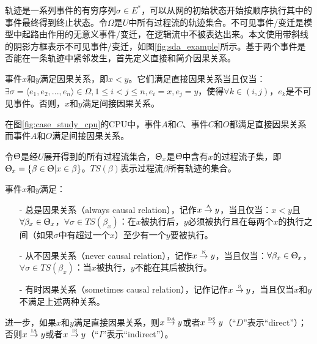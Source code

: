 轨迹是一系列事件的有穷序列$\sigma\in E^{*}$，可以从网的初始状态开始按顺序执行其中的事件最终得到终止状态。令$\Omega$是$U$中所有过程流的轨迹集合。不可见事件/变迁是模型中起路由作用的无意义事件/变迁，在逻辑流中不被表达出来\cite{wen2007mining}。本文使用带斜线的阴影方框表示不可见事件/变迁，如图\ref{fig:sda_example}所示。基于两个事件是否能在一条轨迹中紧邻发生，首先定义直接和简介因果关系。

\begin{definition}[直接和间接因果关系]\label{def:d_i_causal_relation}
事件$x$和$y$满足因果关系，即$x<y$。它们满足直接因果关系当且仅当：$\exists\sigma=\langle e_{1},e_{2},...,e_{n}\rangle\in\Omega,1\leq i<j\leq n,e_{i}=x,e_{j}=y$，使得$\forall k\in(i,j)$，$e_{k}$是不可见事件。否则，$x$和$y$满足间接因果关系。
\end{definition}

\begin{example}\label{ex:sda}
在图\ref{fig:case_study_cpu}的CPU中，事件$A$和$C$、事件$C$和$O$都满足直接因果关系而事件$A$和$O$满足间接因果关系。
\end{example}

令$\Uptheta$是经$U$展开得到的所有过程流集合，$\Uptheta_{x}$是$\Uptheta$中含有$x$的过程流子集，即$\Uptheta_{x}=\{\beta\in\Uptheta|x\in\beta\}$。$TS(\beta)$表示过程流$\beta$所有轨迹的集合。

\begin{definition}[事件间扩展不确定性精炼因果关系]\label{def:exroru_causal}
事件$x$和$y$满足：
  \begin{itemize}
  	\item[-] 总是因果关系（always causal relation），记作$x\overset{\text{\tiny{A}}}{\rightarrow}y$，当且仅当：$x<y$且$\forall\beta_{x}\in\Uptheta_{x}$，$\forall\sigma\in TS(\beta_{x})$：在$x$被执行后，$y$必须被执行且在每两个$x$的执行之间（如果$\sigma$中有超过一个$x$）至少有一个$y$要被执行。
  	\item[-] 从不因果关系（never causal relation），记作$x\overset{\text{\tiny{N}}}{\rightarrow}y$，当且仅当：$\forall\beta_{x}\in\Uptheta_{x}$，$\forall\sigma\in TS(\beta_{x})$：当$x$被执行，$y$不能在其后被执行。
  	\item[-] 有时因果关系（sometimes causal relation），记作记作$x\overset{\text{\tiny{S}}}{\rightarrow}y$，当且仅当$x$和$y$不满足上述两种关系。
  \end{itemize}
进一步，如果$x$和$y$满足直接因果关系，则$x\overset{\text{\tiny{DA}}}{\rightarrow}y$或者$x\overset{\text{\tiny{DS}}}{\rightarrow}y$（“$D$”表示“direct”）；否则$x\overset{\text{\tiny{IA}}}{\rightarrow}y$或者$x\overset{\text{\tiny{IS}}}{\rightarrow}y$（“$I$”表示“indirect”）。
\end{definition}

